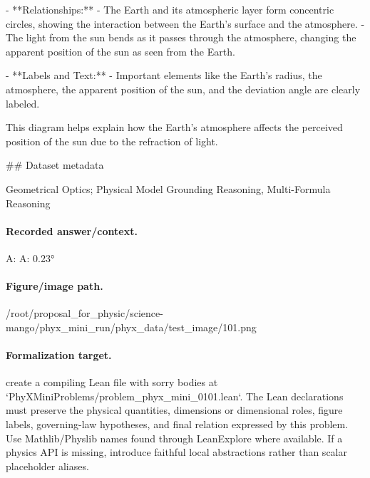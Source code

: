 - **Relationships:**
  - The Earth and its atmospheric layer form concentric circles, showing the interaction between the Earth's surface and the atmosphere.
  - The light from the sun bends as it passes through the atmosphere, changing the apparent position of the sun as seen from the Earth.

- **Labels and Text:**
  - Important elements like the Earth's radius, the atmosphere, the apparent position of the sun, and the deviation angle are clearly labeled.

This diagram helps explain how the Earth's atmosphere affects the perceived position of the sun due to the refraction of light.

\#\# Dataset metadata

Geometrical Optics; Physical Model Grounding Reasoning, Multi-Formula Reasoning

\paragraph{Recorded answer/context.}
A: A: 0.23°

\paragraph{Figure/image path.}
/root/proposal\_for\_physic/science-mango/phyx\_mini\_run/phyx\_data/test\_image/101.png

\paragraph{Formalization target.}
create a compiling Lean file with sorry bodies at `PhyXMiniProblems/problem\_phyx\_mini\_0101.lean`. The Lean declarations must preserve the physical quantities, dimensions or dimensional roles, figure labels, governing-law hypotheses, and final relation expressed by this problem.
Use Mathlib/Physlib names found through LeanExplore where available. If a physics API is missing, introduce faithful local abstractions rather than scalar placeholder aliases.

